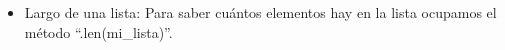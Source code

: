 \begin{itemize}
      \begin{figure}[h]
        \centering
      \end{figure}
\newpage
    \item Largo de una lista: Para saber cuántos elementos hay en la lista ocupamos el método ``.len(mi\_lista)''.
    \begin{figure}[h]
        \centering
      \end{figure}
    

\end{itemize}
